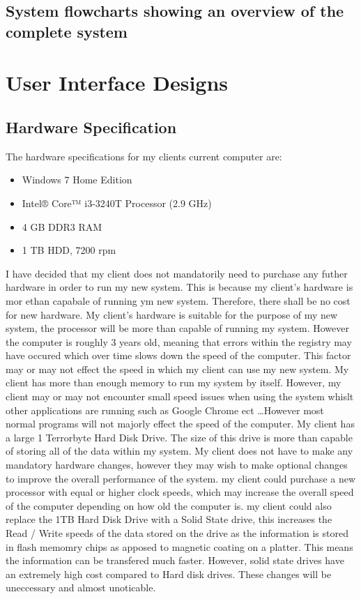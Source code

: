 \begin{itemize}
\subsection{System flowcharts showing an overview of the complete system}


\section{User Interface Designs}

\subsection{Hardware Specification}
	
\begin{flushleft}
The hardware specifications for my clients current computer are: \par

\begin{itemize}
\item Windows 7 Home Edition
\item Intel® Core™ i3-3240T Processor (2.9 GHz)
\item 4 GB DDR3 RAM
\item 1 TB HDD, 7200 rpm
\end{itemize}

I have decided that my client does not mandatorily need to purchase any futher hardware in order to run my new system. This is because my client's hardware is mor ethan capabale of running ym new system. Therefore, there shall be no cost for new hardware. My client's hardware is suitable for the purpose of my new system, the processor will be more than capable of running my system. However the computer is roughly 3 years old, meaning that errors within the registry may have occured which over time slows down the speed of the computer. This factor may or may not effect the speed in which my client can use my new system. My client has more than enough memory to run my system by itself. However, my client may or may not encounter small speed issues when using the system whislt other applications are running such as Google Chrome ect \ldots However most normal programs will not majorly effect the speed of the computer.  My client has a large 1 Terrorbyte Hard Disk Drive. The size of this drive is more than capable of storing all of the data within my system. My client does not have to make any mandatory hardware changes, however they may wish to make optional changes to improve the overall performance of the system. my client could purchase a new processor with equal or higher clock speeds, which may increase the overall speed of the computer depending on how old the computer is.  my client could also replace the 1TB Hard Disk Drive with a Solid State drive, this increases the Read / Write speeds of the data stored on the drive as the information is stored in flash memomry chips as apposed to magnetic coating on a platter. This means the information can be transfered much faster. However, solid state drives have an extremely high cost compared to Hard disk drives. These changes will be uneccessary and almost unoticable.
\end{flushleft}

\end{itemize}
